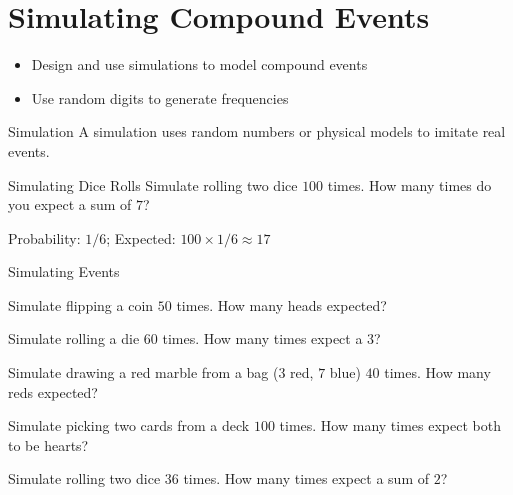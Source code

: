 \section{Simulating Compound Events}

\begin{learningGoals}
\begin{itemize}
    \item Design and use simulations to model compound events
    \item Use random digits to generate frequencies
\end{itemize}
\end{learningGoals}

\begin{conceptBox}{Simulation}
A simulation uses random numbers or physical models to imitate real events.
\end{conceptBox}

\begin{workedExample}{Simulating Dice Rolls}
Simulate rolling two dice $100$ times. How many times do you expect a sum of $7$?

Probability: $1/6$; Expected: $100 \times 1/6 \approx 17$
\end{workedExample}


\begin{practiceBox}{Simulating Events}
\resetProblems

\prob Simulate flipping a coin $50$ times. How many heads expected?

\prob Simulate rolling a die $60$ times. How many times expect a $3$?

\prob Simulate drawing a red marble from a bag ($3$ red, $7$ blue) $40$ times. How many reds expected?

\prob Simulate picking two cards from a deck $100$ times. How many times expect both to be hearts?

\prob Simulate rolling two dice $36$ times. How many times expect a sum of $2$?

\end{practiceBox}
